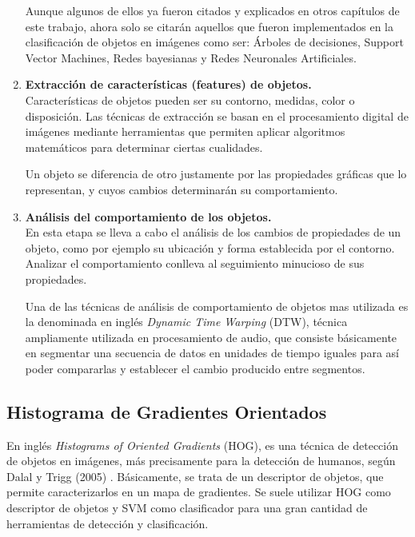 \documentclass[a4paper,12pt,oneside,spanish]{book}
\begin{document}
\begin{enumerate}[label=\alph*)]
		Aunque algunos de ellos ya fueron citados y explicados en otros capítulos de este trabajo, ahora solo se citarán aquellos que fueron implementados en la clasificación de objetos en imágenes como ser: Árboles de decisiones, Support Vector Machines, Redes bayesianas y Redes Neuronales Artificiales.\par
	\item \textbf{Extracción de características (features) de objetos.}\\
		Características de objetos pueden ser su contorno, medidas, color o disposición. Las técnicas de extracción se basan en el procesamiento digital de imágenes mediante herramientas que permiten aplicar algoritmos matemáticos para determinar ciertas cualidades.\par
		Un objeto se diferencia de otro justamente por las propiedades gráficas que lo representan, y cuyos cambios determinarán su comportamiento.\par
	\item \textbf{Análisis del comportamiento de los objetos.}\\
		En esta etapa se lleva a cabo el análisis de los cambios de propiedades de un objeto, como por ejemplo su ubicación y forma establecida por el contorno. Analizar el comportamiento conlleva al seguimiento minucioso de sus propiedades.\par
		Una de las técnicas de análisis de comportamiento de objetos mas utilizada es la denominada en inglés \textit{Dynamic Time Warping} (DTW), técnica ampliamente utilizada en procesamiento de audio, que consiste básicamente en segmentar una secuencia de datos en unidades de tiempo iguales para así poder compararlas y establecer el cambio producido entre segmentos.\par 
\end{enumerate}

\subsection{Histograma de Gradientes Orientados}
En inglés \textit{Histograms of Oriented Gradients} (HOG), es una técnica de detección de objetos en imágenes, más precisamente para la detección de humanos, según Dalal y Trigg (2005) \cite{hog1}. Básicamente, se trata de un descriptor de objetos, que permite caracterizarlos en un mapa de gradientes. Se suele utilizar HOG como descriptor de objetos y SVM como clasificador para una gran cantidad de herramientas de detección y clasificación.\par
\end{document}
